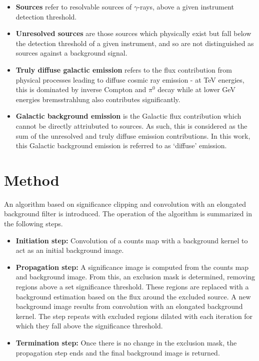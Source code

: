 \documentclass{PoS}
\begin{document}
\begin{itemize}
\item{\textbf{Sources} refer to resolvable sources of $\gamma$-rays, above a given instrument detection threshold.}
\item{\textbf{Unresolved sources} are those sources which physically exist but fall below the detection threshold of a given instrument, and so are not distinguished as sources against a background signal.}
\item{\textbf{Truly diffuse galactic emission} refers to the flux contribution from physical processes leading to diffuse cosmic ray emission - at TeV energies, this is dominated by inverse Compton and $\pi^0$ decay while at lower GeV energies bremsstrahlung also contributes significantly.}
\item{\textbf{Galactic background emission} is the Galactic flux contribution which cannot be directly attriubuted to sources. As such, this is considered as the sum of the unresolved and truly diffuse emission contributions. In this work, this Galactic background emission is referred to as `diffuse' emission.}
\end{itemize}

\section{Method}

An algorithm based on significance clipping and convolution with an elongated background filter is introduced. The operation of the algorithm is summarized in the following steps.

\begin{itemize}
\item{\textbf{Initiation step:} Convolution of a counts map with a background kernel to act as an initial background image.}
\item{\textbf{Propagation step:} A significance image is computed from the counts map and background image. From this, an exclusion mask is determined, removing regions above a set significance threshold. These regions are replaced with a background estimation based on the flux around the excluded source. A new background image results from convolution with an elongated background kernel. The step repeats with excluded regions dilated with each iteration for which they fall above the significance threshold.}
\item{\textbf{Termination step:} Once there is no change in the exclusion mask, the propagation step ends and the final background image is returned.}
\end{itemize}
\end{document}
